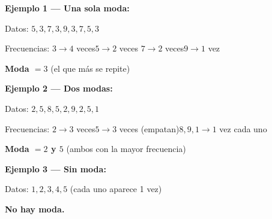 \documentclass[12pt, letterpaper]{article}
\begin{document}
	\begin{ejemplo}
		\textbf{Ejemplo 1 — Una sola moda:}
		
		Datos: $5, 3, 7, 3, 9, 3, 7, 5, 3$
		
		Frecuencias: \quad $3 \to 4$ veces\quad $5 \to 2$ veces
		\quad $7 \to 2$ veces\quad $9 \to 1$ vez
		
		\textbf{Moda $= 3$} (el que más se repite)
		
		\textbf{Ejemplo 2 — Dos modas:}
		
		Datos: $2, 5, 8, 5, 2, 9, 2, 5, 1$
		
		Frecuencias: \quad $2 \to 3$ veces\quad $5 \to 3$ veces
		(empatan)\quad $8, 9, 1 \to 1$ vez cada uno
		
		\textbf{Moda $= 2$ y $5$} (ambos con la mayor frecuencia)
		
		\textbf{Ejemplo 3 — Sin moda:}
		
		Datos: $1, 2, 3, 4, 5$ (cada uno aparece 1 vez)
		
		\textbf{No hay moda.}
	\end{ejemplo}
	
\end{document}
